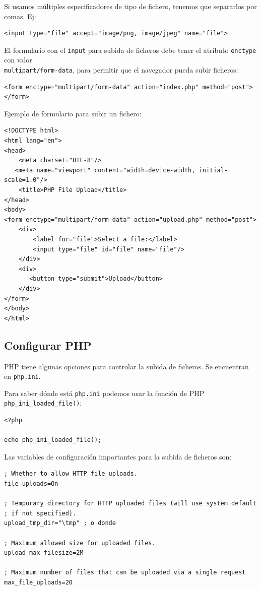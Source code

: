 \documentclass[11pt]{article}
\begin{document}
Si usamos múltiples especificadores de tipo de fichero, tenemos que
separarlos por comas. Ej:
\begin{verbatim}
<input type="file" accept="image/png, image/jpeg" name="file">
\end{verbatim}

El formulario con el \texttt{input} para subida de ficheros debe tener el
atributo \texttt{enctype} con valor \\
\texttt{multipart/form-data}, para permitir que el navegador pueda subir
ficheros:
\begin{verbatim}
<form enctype="multipart/form-data" action="index.php" method="post">
</form>
\end{verbatim}

Ejemplo de formulario para subir un fichero:
\begin{verbatim}
<!DOCTYPE html>
<html lang="en">
<head>
    <meta charset="UTF-8"/>
   <meta name="viewport" content="width=device-width, initial-scale=1.0"/>
    <title>PHP File Upload</title>
</head>
<body>
<form enctype="multipart/form-data" action="upload.php" method="post">
    <div>
        <label for="file">Select a file:</label>
        <input type="file" id="file" name="file"/>
    </div>
    <div>
       <button type="submit">Upload</button>
    </div>
</form>
</body>
</html>
\end{verbatim}

\subsection{Configurar PHP}
\label{sec:org889b73b}
PHP tiene algunas opciones para controlar la subida de ficheros. Se
encuentran en \texttt{php.ini}.

Para saber dónde está \texttt{php.ini} podemos usar la función de PHP
\texttt{php\_ini\_loaded\_file()}:
\begin{verbatim}
<?php

echo php_ini_loaded_file();
\end{verbatim}

Las variables de configuración importantes para la subida de ficheros son:
\begin{verbatim}
; Whether to allow HTTP file uploads.
file_uploads=On

; Temporary directory for HTTP uploaded files (will use system default
; if not specified).
upload_tmp_dir="\tmp" ; o donde

; Maximum allowed size for uploaded files.
upload_max_filesize=2M

; Maximum number of files that can be uploaded via a single request
max_file_uploads=20
\end{verbatim}
\end{document}
